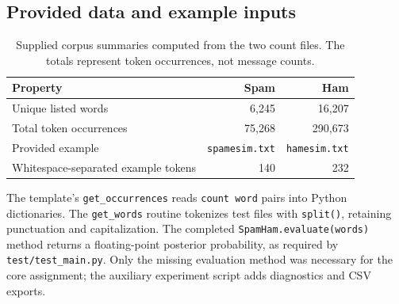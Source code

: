 \documentclass[11pt,letterpaper]{article}
\begin{document}
\subsection{Provided data and example inputs}
\begin{table}[ht]
\centering\caption{Supplied corpus summaries computed from the two count files. The totals represent token occurrences, not message counts.}\label{tab:corpus}
\begin{tabular}{lrr}\toprule
Property & Spam & Ham\\\midrule
Unique listed words & 6,245 & 16,207\\
Total token occurrences & 75,268 & 290,673\\
Provided example & \texttt{spamesim.txt} & \texttt{hamesim.txt}\\
Whitespace-separated example tokens & 140 & 232\\\bottomrule
\end{tabular}
\end{table}
The template's \texttt{get\_occurrences} reads \texttt{count word} pairs into Python dictionaries. The \texttt{get\_words} routine tokenizes test files with \texttt{split()}, retaining punctuation and capitalization. The completed \texttt{SpamHam.evaluate(words)} method returns a floating-point posterior probability, as required by \texttt{test/test\_main.py}. Only the missing evaluation method was necessary for the core assignment; the auxiliary experiment script adds diagnostics and CSV exports.
\end{document}
